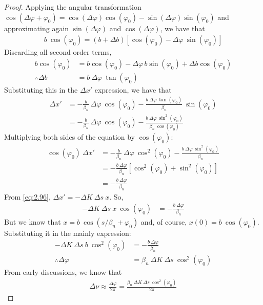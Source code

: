 \begin{proof}
	Applying the angular transformation $\cos(\Delta \varphi + \varphi_0) = \cos(\Delta \varphi)\cos(\varphi_0) - \sin(\Delta \varphi)\sin(\varphi_0)$ and approximating again $\sin(\Delta \varphi)$ and $\cos(\Delta \varphi)$, we have that
	\begin{align*}
		b\ \cos(\varphi_0) = (b+\Delta b)[\cos(\varphi_0)-\Delta \varphi\ \sin(\varphi_0)]
	\end{align*}
	Discarding all second order terms,
	\begin{align*}
		b\cos{(\varphi_0)} &=b\cos{(\varphi_0)} - \Delta\varphi\, b\sin{(\varphi_0)} + \Delta b \cos{(\varphi_0)}\\
		\therefore \Delta b &= b\ \Delta \varphi\ \tan(\varphi_0)
	\end{align*}
	Substituting this in the  $\Delta x'$ expression, we have that
	\begin{align*}
		\Delta x' &= -\frac{b}{\beta_n}\ \Delta \varphi\ \cos(\varphi_0) - \frac{b\ \Delta \varphi\ \tan(\varphi_0)}{\beta_n}\ \sin(\varphi_0)\\
				  &= -\frac{b}{\beta_n}\ \Delta \varphi\ \cos(\varphi_0) - \frac{b\ \Delta \varphi\ \sin^2(\varphi_0)}{\beta_n\ \cos(\varphi_0)}
	\end{align*}
	Multiplying both sides of the equation by $\cos(\varphi_0)$:
	\begin{align*}
		\cos(\varphi_0)\ \Delta x' &= -\frac{b}{\beta_n}\ \Delta \varphi\ \cos^2(\varphi_0) - \frac{b\ \Delta \varphi\ \sin^2(\varphi_0)}{\beta_n}\\
			&= -\frac{b\ \Delta \varphi}{\beta_n}[\cos^2(\varphi_0)+\sin^2(\varphi_0)]\\
			&= -\frac{b\ \Delta \varphi}{\beta_n}
	\end{align*}
	From \eqref{eq:2.96}, $\Delta x' = -\Delta K\ \Delta s\ x$. So,
	\begin{align*}
		-\Delta K\ \Delta s\ x\ \cos(\varphi_0) &= -\frac{b\ \Delta \varphi}{\beta_n}
	\end{align*}
	But we know that $x = b\ \cos(s/\beta_n + \varphi_0)$ and, of course, $x(0) = b\ \cos(\varphi_0)$. Substituting it in the mainly expression:
	\begin{align*}
		-\Delta K\ \Delta s\ b\ \cos^2(\varphi_0) &= -\frac{b\ \Delta \varphi}{\beta_n}\\
		\therefore \Delta \varphi &= \beta_n\ \Delta K\ \Delta s\ \cos^2(\varphi_0)
	\end{align*}
	From early discussions, we know that
	\begin{align*}
		\Delta \nu \approx \frac{\Delta \varphi}{2\pi} = \frac{\beta_n\ \Delta K\ \Delta s\ \cos^2(\varphi_0)}{2\pi}

\end{align*}
\end{proof}
